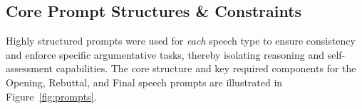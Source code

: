 \documentclass{article}
\begin{document}
\subsection{Core Prompt Structures \& Constraints}
\label{subsec:prompts}
Highly structured prompts were used for \textit{each} speech type to ensure consistency and enforce specific argumentative tasks, thereby isolating reasoning and self-assessment capabilities. The core structure and key required components for the Opening, Rebuttal, and Final speech prompts are illustrated in Figure~\ref{fig:prompts}.
\end{document}
